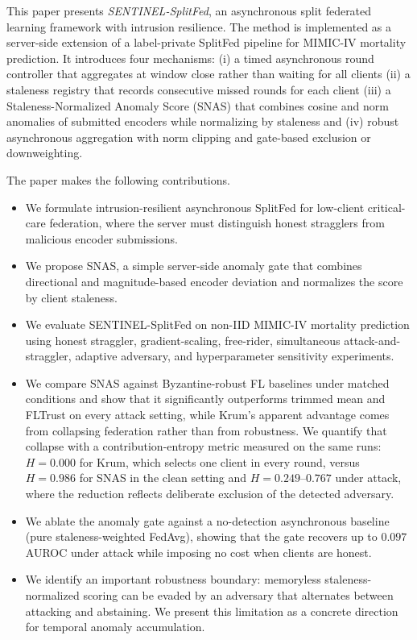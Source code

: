\documentclass[pdflatex,sn-mathphys-num]{sn-jnl}
\begin{document}
This paper presents \emph{SENTINEL-SplitFed}, an asynchronous split federated learning framework with intrusion resilience. The method is implemented as a server-side extension of a label-private SplitFed pipeline for MIMIC-IV mortality prediction. It introduces four mechanisms: (i) a timed asynchronous round controller that aggregates at window close rather than waiting for all clients (ii) a staleness registry that records consecutive missed rounds for each client (iii) a Staleness-Normalized Anomaly Score (SNAS) that combines cosine and norm anomalies of submitted encoders while normalizing by staleness and (iv) robust asynchronous aggregation with norm clipping and gate-based exclusion or downweighting.

The paper makes the following contributions.
\begin{itemize}
    \item We formulate intrusion-resilient asynchronous SplitFed for low-client critical-care federation, where the server must distinguish honest stragglers from malicious encoder submissions.
    \item We propose SNAS, a simple server-side anomaly gate that combines directional and magnitude-based encoder deviation and normalizes the score by client staleness.
    \item We evaluate SENTINEL-SplitFed on non-IID MIMIC-IV mortality prediction using honest straggler, gradient-scaling, free-rider, simultaneous attack-and-straggler, adaptive adversary, and hyperparameter sensitivity experiments.
    \item We compare SNAS against Byzantine-robust FL baselines under matched conditions and show that it significantly outperforms trimmed mean and FLTrust on every attack setting, while Krum's apparent advantage comes from collapsing federation rather than from robustness. We quantify that collapse with a contribution-entropy metric measured on the same runs: $H=0.000$ for Krum, which selects one client in every round, versus $H=0.986$ for SNAS in the clean setting and $H=0.249$--$0.767$ under attack, where the reduction reflects deliberate exclusion of the detected adversary.
    \item We ablate the anomaly gate against a no-detection asynchronous baseline (pure staleness-weighted FedAvg), showing that the gate recovers up to $0.097$ AUROC under attack while imposing no cost when clients are honest.
    \item We identify an important robustness boundary: memoryless staleness-normalized scoring can be evaded by an adversary that alternates between attacking and abstaining. We present this limitation as a concrete direction for temporal anomaly accumulation.
\end{itemize}
\end{document}
